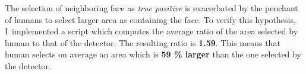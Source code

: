 The selection of neighboring face as \textit{true positive} is exacerbated by the penchant of humans to select larger
area as containing the face.
To verify this hypothesis, I implemented a script which computes the average ratio of the area selected by human
to that of the detector.
The resulting ratio is \textbf{1.59}.
This means that human selects on average an area which is \textbf{59 \% larger} than the one selected by the detector.